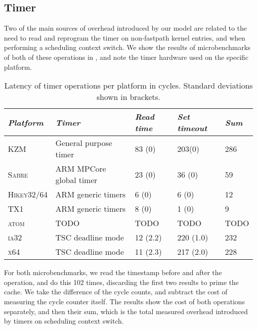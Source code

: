 \subsection{Timer}
\label{s:eval-timer}

Two of the main sources of overhead introduced by our model are related to the need to read and reprogram the timer on
non-fastpath kernel entries, and when performing a scheduling context switch. We show the results of
microbenchmarks of both of these operations in , and note the timer
hardware used on the specific platform. 

\begin{table}[ht]\centering
{}
\begin{tabular}{*5l}\toprule
    \emph{Platform} & \emph{Timer} & \emph{Read time} & \emph{Set timeout} & \emph{Sum}
    \\\midrule
    \textsc{KZM}               & General purpose timer    & 83 (0)   & 203(0)  & 286   \\
    \textsc{Sabre}             & ARM MPCore global timer  & 23 (0)   & 36 (0)  & 59    \\
    \textsc{Hikey32/64}        & ARM generic timers       &  6 (0)   &  6 (0)  & 12    \\
    \textsc{TX1}               & ARM generic timers       &  8 (0)   &  1 (0)  & 9     \\
    \textsc{atom}              & TODO                     & TODO     & TODO    & TODO  \\
    \textsc{ia32}              & TSC deadline mode        & 12 (2.2) & 220 (1.0) & 232 \\
    \textsc{x64}               & TSC deadline mode        & 11 (2.3) & 217 (2.0) & 228 \\
    \bottomrule\hline
\end{tabular}
\caption{Latency of timer operations per platform in cycles. Standard deviations shown
in brackets.}
\label{t:evaluation-timer}
\end{table}

For both microbenchmarks, we read the timestamp before and after the operation, and do this 102
times, discarding the first two results to prime the cache.  We take the difference of the cycle
counts, and subtract the cost of measuring the cycle counter itself. The results show the cost of
both operations separately, and then their sum, which is the total measured overhead introduced by timers on
scheduling context switch.

